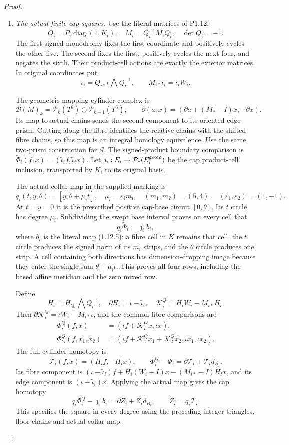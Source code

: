 \begin{proof}
\begin{enumerate}[label=\arabic*.]
\item \emph{The actual finite-cap squares.}
Use the literal matrices of P1.12:
\[
 Q_i=P_i\operatorname{diag}(1,K_i),\quad
 \widetilde M_i=Q_i^{-1}M_iQ_i,\quad \det Q_i=-1.
\]
The first signed monodromy fixes the first coordinate and positively
cycles the other five. The second fixes the first, positively cycles
the next four, and negates the sixth. Their product-cell actions
are exactly the exterior matrices. In original coordinates put
\[
 \widetilde\iota_i=Q_{i*}\iota\bigwedge Q_i^{-1},\qquad
 M_{i*}\widetilde\iota_i=\widetilde\iota_iW_i.
\]

The geometric mapping-cylinder complex is
\[
 \mathcal B(M)_k=\mathcal P_k(T^6)\oplus\mathcal P_{k-1}(T^6),
 \qquad
 \partial(a,x)=(\partial a+(M_*-I)x,-\partial x).
\]
Its map to actual chains sends the second component to its oriented
edge prism. Cutting along the fibre identifies the relative chains
with the shifted fibre chains, so this map is an integral homology
equivalence. Use the same two-prism construction for $\mathcal G$.
The signed-product boundary comparison is
$\widetilde\Phi_i(f,x)=(\widetilde\iota_if,\widetilde\iota_ix)$.
Let $\jmath_i:E_i\to\mathcal P_*(E_i^{\rm geom})$ be the cap
product-cell inclusion, transported by $K_i$ to its original basis.

The actual collar map in the supplied marking is
\[
 q_i(t,y,\theta)=[y,\theta+\mu_it],\quad
 \mu_i=\varepsilon_im_i,\quad (m_1,m_2)=(5,4),\quad
 (\varepsilon_1,\varepsilon_2)=(1,-1).
\]
At $t=y=0$ it is the prescribed positive cap-base circuit
$[0,\theta]$. Its $t$ circle has degree $\mu_i$.
Subdividing the swept base interval proves on every cell that
\[
 q_i\widetilde\Phi_i=\jmath_i b_i,
\]
where $b_i$ is the literal map (1.12.5): a fibre cell in $K$ remains
that cell, the $t$ circle produces the signed norm of its $m_i$
strips, and the $\theta$ circle produces one strip. A cell containing
both directions has dimension-dropping image because they enter the
single sum $\theta+\mu_it$. This proves all four rows, including
the based affine meridian and the zero mixed row.

Define
\[
 H_i=H_{Q_i}\bigwedge Q_i^{-1},\quad
 \partial H_i=\iota-\widetilde\iota_i,\quad
 \mathcal K_i^Q=H_iW_i-M_{i*}H_i.
\]
Then $\partial\mathcal K_i^Q=\iota W_i-M_{i*}\iota$, and the
common-fibre comparisons are
\[
\begin{split}
 \Phi_i^Q(f,x)&=(\iota f+\mathcal K_i^Qx,\iota x),\\
 \Phi_G^Q(f,x_1,x_2)&=
 (\iota f+\mathcal K_1^Qx_1+\mathcal K_2^Qx_2,
                                      \iota x_1,\iota x_2).
\end{split}
\]
The full cylinder homotopy is
\[
 \mathcal T_i(f,x)=(H_if,-H_ix),\qquad
 \Phi_i^Q-\widetilde\Phi_i
       =\partial\mathcal T_i+\mathcal T_i d_{B_i}.
\]
Its fibre component is
$(\iota-\widetilde\iota_i)f+H_i(W_i-I)x-(M_{i*}-I)H_ix$,
and its edge component is $(\iota-\widetilde\iota_i)x$.
Applying the actual map gives the cap homotopy
\[
 q_i\Phi_i^Q-\jmath_i b_i=\partial Z_i+Z_i d_{B_i},
 \qquad Z_i=q_i\mathcal T_i.
\]
This specifies the square in every degree using the preceding
integer triangles, floor chains and actual collar map.


\end{enumerate}
\end{proof}
